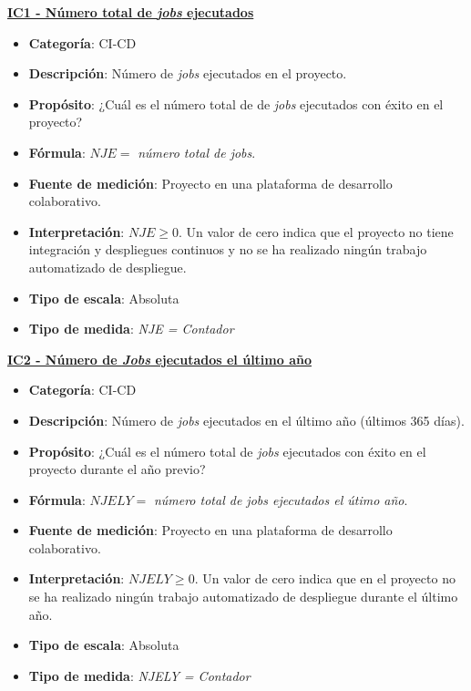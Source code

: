 \textbf{\underline{IC1 - Número total de \textit{jobs} ejecutados}}
\begin{itemize}
	\item \textbf{Categoría}: CI-CD
	\item \textbf{Descripción}: Número de \textit{jobs} ejecutados en el proyecto.
	\item \textbf{Propósito}: ¿Cuál es el número total de de \textit{jobs} ejecutados con éxito en el proyecto?
	\item \textbf{Fórmula}: $NJE =$ \textit{número total de jobs}.
	\item \textbf{Fuente de medición}: Proyecto en una plataforma de desarrollo colaborativo.
	\item \textbf{Interpretación}: $NJE \geq 0$. Un valor de cero indica que el proyecto no tiene integración y despliegues continuos y no se ha realizado ningún trabajo automatizado de despliegue.
	\item \textbf{Tipo de escala}: Absoluta
	\item \textbf{Tipo de medida}: \textit{NJE = Contador}
\end{itemize}

\textbf{\underline{IC2 - Número de \textit{Jobs} ejecutados el último año}}
\begin{itemize}
	\item \textbf{Categoría}: CI-CD
	\item \textbf{Descripción}: Número de \textit{jobs} ejecutados en el último año (últimos 365 días).
	\item \textbf{Propósito}: ¿Cuál es el número total de \textit{jobs} ejecutados con éxito en el proyecto durante el año previo?
	\item \textbf{Fórmula}: $NJELY =$ \textit{número total de jobs ejecutados el útimo año}.
	\item \textbf{Fuente de medición}: Proyecto en una plataforma de desarrollo colaborativo.
	\item \textbf{Interpretación}: $NJELY \geq 0$. Un valor de cero indica que en el proyecto no se ha realizado ningún trabajo automatizado de despliegue durante el último año.
	\item \textbf{Tipo de escala}: Absoluta
	\item \textbf{Tipo de medida}: \textit{NJELY = Contador}
\end{itemize}

